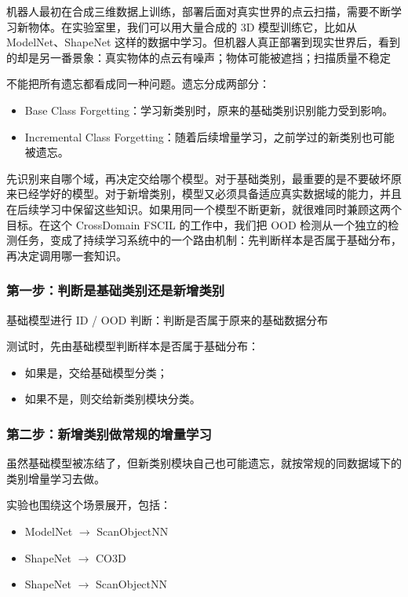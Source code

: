 机器人最初在合成三维数据上训练，部署后面对真实世界的点云扫描，需要不断学习新物体。在实验室里，我们可以用大量合成的 3D 模型训练它，比如从 ModelNet、ShapeNet 这样的数据中学习。但机器人真正部署到现实世界后，看到的却是另一番景象：真实物体的点云有噪声；物体可能被遮挡；扫描质量不稳定

不能把所有遗忘都看成同一种问题。遗忘分成两部分：

\begin{itemize}
  \item Base Class Forgetting：学习新类别时，原来的基础类别识别能力受到影响。
  \item Incremental Class Forgetting：随着后续增量学习，之前学过的新类别也可能被遗忘。
\end{itemize}

先识别来自哪个域，再决定交给哪个模型。对于基础类别，最重要的是不要破坏原来已经学好的模型。对于新增类别，模型又必须具备适应真实数据域的能力，并且在后续学习中保留这些知识。如果用同一个模型不断更新，就很难同时兼顾这两个目标。在这个 CrossDomain FSCIL 的工作中，我们把 OOD 检测从一个独立的检测任务，变成了持续学习系统中的一个路由机制：先判断样本是否属于基础分布，再决定调用哪一套知识。

\subsubsection*{第一步：判断是基础类别还是新增类别}

基础模型进行 ID / OOD 判断：判断是否属于原来的基础数据分布

测试时，先由基础模型判断样本是否属于基础分布：

\begin{itemize}
  \item 如果是，交给基础模型分类；
  \item 如果不是，则交给新类别模块分类。
\end{itemize}

\subsubsection*{第二步：新增类别做常规的增量学习}

虽然基础模型被冻结了，但新类别模块自己也可能遗忘，就按常规的同数据域下的类别增量学习去做。

实验也围绕这个场景展开，包括：

\begin{itemize}
  \item ModelNet $\rightarrow$ ScanObjectNN
  \item ShapeNet $\rightarrow$ CO3D
  \item ShapeNet $\rightarrow$ ScanObjectNN
\end{itemize}

